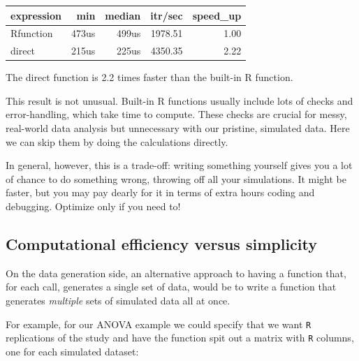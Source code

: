 \documentclass[
]{book}
\begin{document}
\begin{tabular}{l|r|r|r|r}
\hline
expression & min & median & itr/sec & speed\_up\\
\hline
Rfunction & 473us & 499us & 1978.51 & 1.00\\
\hline
direct & 215us & 225us & 4350.35 & 2.22\\
\hline
\end{tabular}

The direct function is 2.2 times faster than the built-in R function.

This result is not unusual.
Built-in R functions usually include lots of checks and error-handling, which take time to compute. These checks are crucial for messy, real-world data analysis but unnecessary with our pristine, simulated data.
Here we can skip them by doing the calculations directly.

In general, however, this is a trade-off: writing something yourself gives you a lot of chance to do something wrong, throwing off all your simulations.
It might be faster, but you may pay dearly for it in terms of extra hours coding and debugging.
Optimize only if you need to!

\subsection{Computational efficiency versus simplicity}\label{sec_comp_efficiency}

On the data generation side, an alternative approach to having a function that, for each call, generates a single set of data, would be to write a function that generates \emph{multiple} sets of simulated data all at once.

For example, for our ANOVA example we could specify that we want \texttt{R} replications of the study and have the function spit out a matrix with \texttt{R} columns, one for each simulated dataset:
\end{document}
